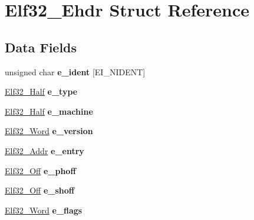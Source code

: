 \hypertarget{structElf32__Ehdr}{\section{Elf32\-\_\-\-Ehdr Struct Reference}
\label{structElf32__Ehdr}
}
\subsection*{Data Fields}
\begin{DoxyCompactItemize}
\item 
\hypertarget{structElf32__Ehdr_aebd5576e5ae99cb99c2eb76d94c7f9f7}{unsigned char {\bfseries e\-\_\-ident} \mbox{[}E\-I\-\_\-\-N\-I\-D\-E\-N\-T\mbox{]}}\label{structElf32__Ehdr_aebd5576e5ae99cb99c2eb76d94c7f9f7}

\item 
\hypertarget{structElf32__Ehdr_a49e40a791813c06e3b6ebcb53aef1bb8}{\hyperlink{structElf32__Half}{Elf32\-\_\-\-Half} {\bfseries e\-\_\-type}}\label{structElf32__Ehdr_a49e40a791813c06e3b6ebcb53aef1bb8}

\item 
\hypertarget{structElf32__Ehdr_a19bca7faba9e5573814643efc3574c7b}{\hyperlink{structElf32__Half}{Elf32\-\_\-\-Half} {\bfseries e\-\_\-machine}}\label{structElf32__Ehdr_a19bca7faba9e5573814643efc3574c7b}

\item 
\hypertarget{structElf32__Ehdr_aa27627bda53281221325df4dd782e800}{\hyperlink{structElf32__Sword}{Elf32\-\_\-\-Word} {\bfseries e\-\_\-version}}\label{structElf32__Ehdr_aa27627bda53281221325df4dd782e800}

\item 
\hypertarget{structElf32__Ehdr_ab8a982696048d807017919b7d0145482}{\hyperlink{structElf32__Addr}{Elf32\-\_\-\-Addr} {\bfseries e\-\_\-entry}}\label{structElf32__Ehdr_ab8a982696048d807017919b7d0145482}

\item 
\hypertarget{structElf32__Ehdr_a25c36fc010284a928604aae005b67ad1}{\hyperlink{structElf32__Addr}{Elf32\-\_\-\-Off} {\bfseries e\-\_\-phoff}}\label{structElf32__Ehdr_a25c36fc010284a928604aae005b67ad1}

\item 
\hypertarget{structElf32__Ehdr_a00601af5187a1b3f8babfe9cddd95c15}{\hyperlink{structElf32__Addr}{Elf32\-\_\-\-Off} {\bfseries e\-\_\-shoff}}\label{structElf32__Ehdr_a00601af5187a1b3f8babfe9cddd95c15}

\item 
\hypertarget{structElf32__Ehdr_a87cf481be7917fafde0c4ecf78c8e574}{\hyperlink{structElf32__Sword}{Elf32\-\_\-\-Word} {\bfseries e\-\_\-flags}}\label{structElf32__Ehdr_a87cf481be7917fafde0c4ecf78c8e574}


\end{DoxyCompactItemize}

